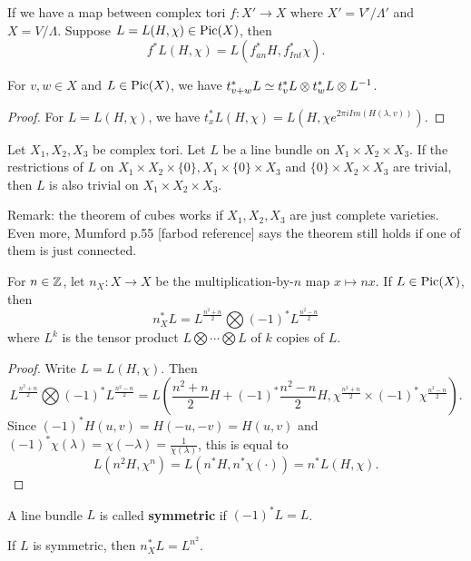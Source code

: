\begin{lemma}
If we have a map between complex tori $f:X'\to X$ where $X'=V'/\Lambda'$ and $X=V/\Lambda$. Suppose $L=L(H,\chi)\in \operatorname{Pic}(X)$, then 
$$f^* L(H,\chi)=L(f^*_{an} H,f^*_{Int}\chi).$$
\end{lemma}

\begin{corollary}
For $v,w\in X$ and $L\in \operatorname{Pic}(X)$, we have $t^*_{v+w}L\simeq t^*_v L\otimes t^*_wL \otimes L^{-1}$.
\end{corollary}

\begin{proof}
For $L=L(H,\chi)$, we have $t^*_x L(H,\chi)=L(H,\chi e^{2\pi i Im(H(\lambda,v))})$.
\end{proof}


\begin{corollary}
Let $X_1,X_2,X_3$ be complex tori. Let $L$ be a line bundle on $X_1\times X_2\times X_3$.  If the restrictions of $L$ on $X_1\times X_2\times \{0\}, X_1\times \{0\}\times X_3$ and $\{0\}\times X_2\times X_3$ are trivial, then $L$ is also trivial on $X_1\times X_2\times X_3$.
\end{corollary}

Remark: the theorem of cubes works if $X_1,X_2,X_3$ are just complete varieties. Even more, Mumford p.55 [farbod reference] says the theorem still holds if one of them is just connected. 

\begin{corollary}
For $n\in {\mathbb Z}$, let $n_X:X\to X$ be the multiplication-by-$n$ map $x\mapsto nx$. If $L\in \operatorname{Pic}(X)$, then 
$$n_X^*L = L^{\frac{n^2+n}{2}}\bigotimes (-1)^* L^{\frac{n^2-n}{2}}$$
where $L^k$ is the tensor product $L\bigotimes \cdots \bigotimes L$ of $k$ copies of $L$.
\end{corollary}

\begin{proof}
Write $L=L(H,\chi)$. Then 
$$L^{\frac{n^2+n}{2}}\bigotimes (-1)^* L^{\frac{n^2-n}{2}}= L(\frac{n^2+n}{2}H + (-1)^* \frac{n^2-n}{2}H,\chi^{\frac{n^2+n}{2}}\times (-1)^*\chi ^{\frac{n^2-n}{2}}).$$
Since $(-1)^* H(u,v)= H(-u,-v)=H(u,v)$ and $(-1)^*\chi(\lambda)=\chi(-\lambda)=\frac{1}{\chi(\lambda)}$, this is equal to 
$$L(n^2H,\chi^n)=L(n^*H, n^*\chi(\cdot))=n^* L(H,\chi).$$
\end{proof}

A line bundle $L$ is called \textbf{symmetric} if $(-1)^*L=L$. 

\begin{corollary}
If $L$ is symmetric, then
$n_X^* L = L^{n^2}$.
\end{corollary}

